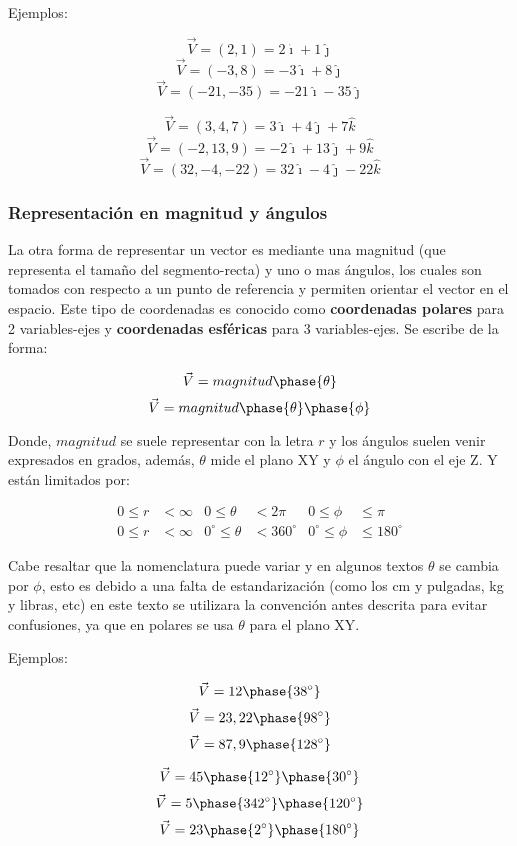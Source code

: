     Ejemplos:

    $$\vec{V}=(2,1)=2\hat{\imath}+1\hat{\jmath}$$
    $$\vec{V}=(-3,8)=-3\hat{\imath}+8\hat{\jmath}$$
    $$\vec{V}=(-21,-35)=-21\hat{\imath}-35\hat{\jmath}$$

    $$\vec{V}=(3,4,7)=3\hat{\imath}+4\hat{\jmath}+7\hat{k}$$
    $$\vec{V}=(-2,13,9)=-2\hat{\imath}+13\hat{\jmath}+9\hat{k}$$
    $$\vec{V}=(32,-4,-22)=32\hat{\imath}-4\hat{\jmath}-22\hat{k}$$


    \subsubsection{Representación en magnitud y ángulos}

    La otra forma de representar un vector es mediante una magnitud (que
    representa el tamaño del segmento-recta) y uno o mas ángulos, los cuales
    son tomados con respecto a un punto de referencia y permiten orientar el
    vector en el espacio. Este tipo de coordenadas es conocido como
    \textbf{coordenadas polares} para 2 variables-ejes y \textbf{coordenadas
    esféricas} para 3 variables-ejes. Se escribe de la forma:

    $$\vec{V}= magnitud \phase{\theta} $$
    $$\vec{V}= magnitud  \phase{\theta}\phase{\phi} $$

    Donde, $magnitud$ se suele representar con la letra $r$ y los ángulos
    suelen venir expresados en grados, además, $\theta$ mide el plano XY y
    $\phi$ el ángulo con el eje Z. Y están limitados por:


     \begin{align*}
         0\leq r&<\infty & 0\leq\theta&<2\pi & 0\leq\phi&\leq\pi \\
         0\leq r&<\infty & 0^\circ\leq\theta&<360^\circ & 0^\circ\leq\phi&\leq180^\circ
    \end{align*}

    Cabe resaltar que la nomenclatura puede variar y en algunos textos $\theta$
    se cambia por $\phi$, esto es debido a una falta de estandarización (como los
    cm y pulgadas, kg y libras, etc) en este texto se utilizara la convención
    antes descrita para evitar confusiones, ya que en polares se usa $\theta$ para
    el plano XY.

    Ejemplos:


    $$\vec{V}=12 \phase{38^\circ} $$
    $$\vec{V}=23,22 \phase{98^\circ} $$
    $$\vec{V}=87,9 \phase{128^\circ} $$

    $$\vec{V}=45 \phase{12^\circ}\phase{30^\circ} $$
    $$\vec{V}=5 \phase{342^\circ}\phase{120^\circ} $$
    $$\vec{V}=23 \phase{2^\circ}\phase{180^\circ} $$

